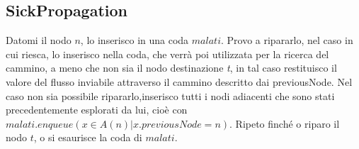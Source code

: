 \documentclass{article}
\begin{document}
\subsection{SickPropagation}

Datomi il nodo $n$, lo inserisco in una coda $malati$.
Provo a ripararlo, nel caso in cui riesca, lo inserisco nella coda, che verrà poi utilizzata per la ricerca del cammino, a meno che non sia il nodo destinazione \textit{t}, in tal caso restituisco il valore del flusso inviabile attraverso il cammino descritto dai previousNode.
Nel caso non sia possibile ripararlo,inserisco tutti i nodi adiacenti che sono stati precedentemente esplorati da lui, cioè con $malati.enqueue( x \in A(n) | x.previousNode = n)$.
Ripeto finché o riparo il nodo $t$, o si esaurisce la coda di $malati$.
\end{document}
